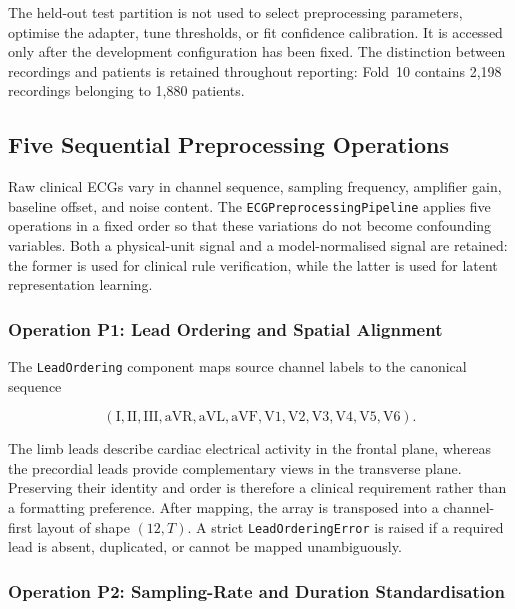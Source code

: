 \documentclass{ssnreview}
\begin{document}
The held-out test partition is not used to select preprocessing parameters, optimise the
adapter, tune thresholds, or fit confidence calibration. It is accessed only after the
development configuration has been fixed. The distinction between recordings and patients
is retained throughout reporting: Fold~10 contains 2,198 recordings belonging to 1,880
patients.

\subsection{Five Sequential Preprocessing Operations}

Raw clinical ECGs vary in channel sequence, sampling frequency, amplifier gain, baseline
offset, and noise content. The \texttt{ECGPreprocessingPipeline} applies five operations
in a fixed order so that these variations do not become confounding variables. Both a
physical-unit signal and a model-normalised signal are retained: the former is used for
clinical rule verification, while the latter is used for latent representation learning.

\subsubsection{Operation P1: Lead Ordering and Spatial Alignment}

The \texttt{LeadOrdering} component maps source channel labels to the canonical sequence

\begin{equation}
  (\mathrm{I},\mathrm{II},\mathrm{III},\mathrm{aVR},\mathrm{aVL},
  \mathrm{aVF},\mathrm{V1},\mathrm{V2},\mathrm{V3},\mathrm{V4},
  \mathrm{V5},\mathrm{V6}).
\end{equation}

The limb leads describe cardiac electrical activity in the frontal plane, whereas the
precordial leads provide complementary views in the transverse plane. Preserving their
identity and order is therefore a clinical requirement rather than a formatting preference.
After mapping, the array is transposed into a channel-first layout of shape $(12,T)$. A
strict \texttt{LeadOrderingError} is raised if a required lead is absent, duplicated, or
cannot be mapped unambiguously.

\subsubsection{Operation P2: Sampling-Rate and Duration Standardisation}
\end{document}
